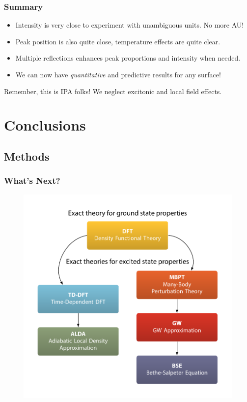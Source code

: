 \documentclass{beamer}
\begin{document}
\begin{frame}
\frametitle{Summary}
\begin{itemize}
\item Intensity is very close to experiment with unambiguous units. No more AU!
\item Peak position is also quite close, temperature effects are quite clear.
\item Multiple reflections enhances peak proportions and intensity when needed.
\item We can now have \emph{quantitative} and predictive results for any surface!
\end{itemize}
Remember, this is IPA folks! We neglect excitonic and local field effects.
\end{frame}



\section{Conclusions}



\subsection{Methods}

\begin{frame}
\frametitle{What's Next?}
\vspace{-0.7cm}
\begin{figure}
\centering
\includegraphics[height=0.95\textheight]{diag-methods}
\end{figure}
\end{frame}
\end{document}
